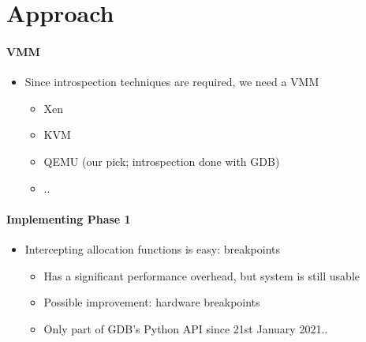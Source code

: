 \documentclass{i20lecture}
\begin{document}
\section{Approach}
\begin{frame}{\insertsection}
  \framesubtitle{VMM}
  
  \begin{itemize}
   \item Since introspection techniques are required, we need a VMM
\pause
    \begin{itemize}
    \item Xen
    \item KVM
    \item QEMU (our pick; introspection done with GDB)
    \item ..
    \end{itemize}
  \end{itemize}
\end{frame}

\begin{frame}{\insertsection}
  \framesubtitle{Implementing Phase 1}
    
    \begin{itemize}
     \item Intercepting allocation functions is easy: breakpoints
     \begin{itemize}
\pause
      \item Has a significant performance overhead, but system is still usable
\pause
      \item Possible improvement: hardware breakpoints
\pause
      \item Only part of GDB's Python API since 21st January 2021..
     \end{itemize}
    \end{itemize}
\end{frame}
\end{document}
